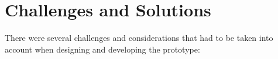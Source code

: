 \section{Challenges and Solutions}
\label{sec:challenges-solutions}
There were several challenges and considerations that had to be taken into account when designing and developing the prototype:

